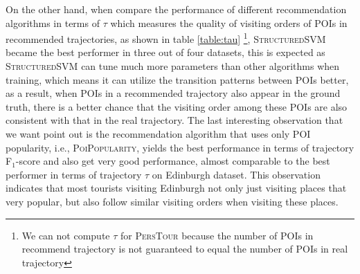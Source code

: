 On the other hand, when compare the performance of different recommendation algorithms in terms of $\tau$
which measures the quality of visiting orders of POIs in recommended trajectories,
as shown in table \ref{table:tau}
\footnote{We can not compute $\tau$ for \textsc{PersTour} because the number of POIs in recommend trajectory is not guaranteed to equal the number of POIs in real trajectory},
\textsc{StructuredSVM} became the best performer in three out of four datasets,
this is expected as \textsc{StructuredSVM} can tune much more parameters than other algorithms when training,
which means it can utilize the transition patterns between POIs better,
as a result, when POIs in a recommended trajectory also appear in the ground truth, 
there is a better chance that the visiting order among these POIs are also consistent with 
that in the real trajectory.
%
% 
The last interesting observation that we want point out is the recommendation algorithm that uses only
POI popularity, i.e., \textsc{PoiPopularity}, yields the best performance in terms of trajectory F$_1$-score and 
also get very good performance, almost comparable to the best performer in terms of trajectory $\tau$ 
on Edinburgh dataset. This observation indicates that most tourists visiting Edinburgh not only just visiting
places that very popular, but also follow similar visiting orders when visiting these places.


